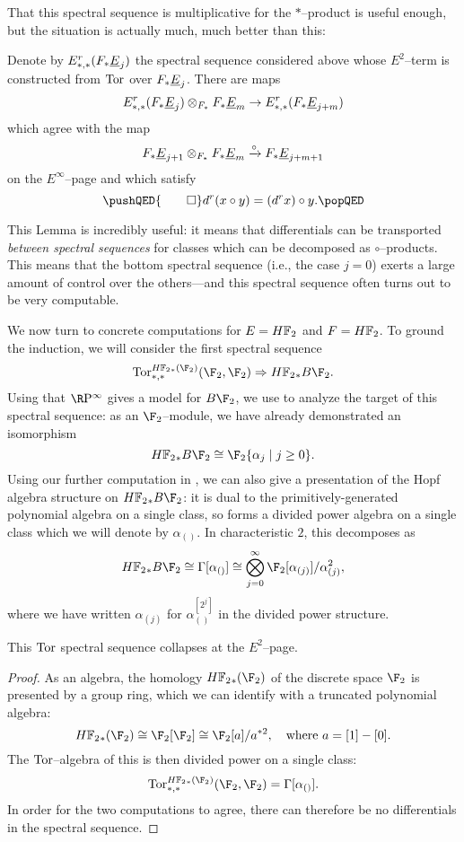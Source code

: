 That this spectral sequence is multiplicative for the \(\ast\)--product is useful enough, but the situation is actually much, much better than this:
\begin{lemma}\label{CircProductAndDifferentials}
Denote by \(E^r_{*, *}(F_* \underline{\smash{E}}_{j})\) the spectral sequence considered above whose \(E^2\)--term is constructed from \(\operatorname{Tor}\) over \(F_* \underline{\smash{E}}_{j}\).  There are maps \[E^r_{*, *}(F_* \underline{\smash{E}}_{j}) \otimes_{F_*} F_* \underline{\smash{E}}_{m} \to E^r_{*, *}(F_* \underline{\smash{E}}_{j+m})\] which agree with the map \[F_* \underline{\smash{E}}_{j+1} \otimes_{F_*} F_* \underline{\smash{E}}_{m} \xrightarrow{\circ} F_* \underline{\smash{E}}_{j+m+1}\] on the \(E^\infty\)--page and which satisfy
\[
\pushQED{\qed}
d^r(x \circ y) = (d^r x) \circ y. \qedhere
\popQED
\]
\end{lemma}
\noindent This Lemma is incredibly useful: it means that differentials can be transported \emph{between spectral sequences} for classes which can be decomposed as \(\circ\)--products.  This means that the bottom spectral sequence (i.e., the case \(j = 0\)) exerts a large amount of control over the others---and this spectral sequence often turns out to be very computable.

We now turn to concrete computations for \(E = \HFtwo\) and \(F = \HFtwo\).  To ground the induction, we will consider the first spectral sequence \[\Tor^{\HFtwo_*(\F_2)}_{*, *}(\F_2, \F_2) \Rightarrow \HFtwo_* B\F_2.\]  Using that \(\RP^\infty\) gives a model for \(B\F_2\), we use  to analyze the target of this spectral sequence: as an \(\F_2\)--module, we have already demonstrated an isomorphism \[\HFtwo_* B\F_2 \cong \F_2\{\alpha_j \mid j \ge 0\}.\]  Using our further computation in , we can also give a presentation of the Hopf algebra structure on \(\HFtwo_* B\F_2\): it is dual to the primitively-generated polynomial algebra on a single class, so forms a divided power algebra on a single class which we will denote by \(\alpha_{()}\).  In characteristic \(2\), this decomposes as \[\HFtwo_* B\F_2 \cong \Gamma[\alpha_{()}] \cong \bigotimes_{j=0}^\infty \F_2[\alpha_{(j)}] / \alpha_{(j)}^2,\] where we have written \(\alpha_{(j)}\) for \(\alpha_{()}^{[2^j]}\) in the divided power structure.

\begin{corollary}
This \(\operatorname{Tor}\) spectral sequence collapses at the \(E^2\)--page.
\end{corollary}
\begin{proof}
As an algebra, the homology \(\HFtwo_*(\F_2)\) of the discrete space \(\F_2\) is presented by a group ring, which we can identify with a truncated polynomial algebra: \[\HFtwo_*(\F_2) \cong \F_2[\F_2] \cong  \F_2[a] / a^{\ast 2}, \quad \text{where \(a = [1] - [0]\)}.\]  The \(\operatorname{Tor}\)--algebra of this is then divided power on a single class: \[\Tor^{\HFtwo_*(\F_2)}_{*, *}(\F_2, \F_2) = \Gamma[\alpha_{()}].\]  In order for the two computations to agree, there can therefore be no differentials in the spectral sequence.
\end{proof}

